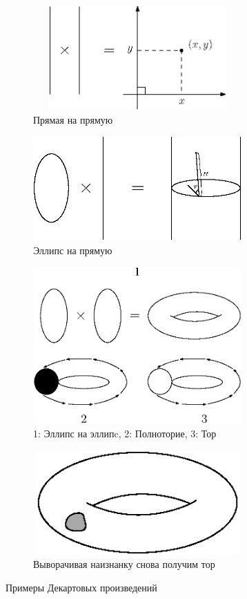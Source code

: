 \documentclass[12pt]{article}
\theoremstyle{definition}
\begin{document}
\begin{figure}[H]
	\centering
	\begin{subfigure}[c]{0.5\textwidth}
		\centering
		\includegraphics[width=8cm, height = 4cm]{2_2.eps}
		\caption{Прямая на прямую}
		\label{fig:2_2}
	\end{subfigure}
	\begin{subfigure}[c]{0.49\textwidth}
		\centering
		\includegraphics[width=8cm, height = 4cm]{2_3.eps}
		\caption{Эллипс на прямую}
		\label{fig:2_3}
	\end{subfigure}
	\begin{subfigure}[c]{0.5\textwidth}
		\centering
		\includegraphics[width=8cm, height = 6cm]{2_4.eps}
		\caption{1: Эллипс на эллипc, 2: Полноторие, 3: Тор}
		\label{fig:2_4}
	\end{subfigure}
	\begin{subfigure}[c]{0.49\textwidth}
		\centering
		\includegraphics[width=8cm, height = 4cm]{2_5.eps}
		\caption{Выворачивая наизнанку снова получим тор}
		\label{fig:2_5}
	\end{subfigure}
	\caption{Примеры Декартовых произведений}	
	\label{fig:Сюръективность}
\end{figure}
\end{document}
